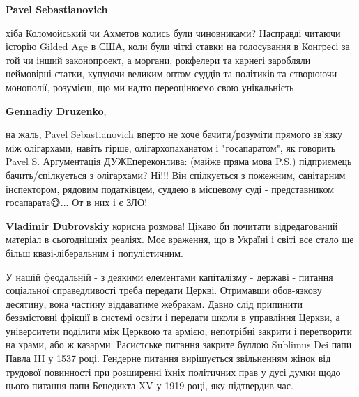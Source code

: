 \begin{itemize}
\begin{itemize}
\textbf{Pavel Sebastianovich} 

хіба Коломойський чи Ахметов колись були чиновниками? Насправді читаючи історію
Gilded Age в США, коли були чіткі ставки на голосування в Конгресі за той чи
інший законопроект, а моргани, рокфелери та карнегі заробляли неймовірні
статки, купуючи великим оптом суддів та політиків та створюючи монополії,
розумієш, що ми надто переоцінюємо свою унікальність \Smiley[1.0][yellow]


 
\textbf{Gennadiy Druzenko}, 

на жаль, Pavel Sebastianovich вперто не хоче бачити/розуміти прямого зв'язку
між олігархами, навіть гірше, олігархопаханатом і "госапаратом", як говорить
Pavel S. Аргументація ДУЖЕ\Laughey[1.0][white] переконлива: (майже пряма мова P.S.) підприємець
бачить/спілкується з олігархами? Ні!!! Він спілкується з пожежним, санітарним
інспектором, рядовим податківцем, суддею в місцевому суді - представником
госапарата😅... От в них і є ЗЛО!

 
\textbf{Vladimir Dubrovskiy} корисна розмова! Цікаво би почитати відредагований
матеріал в сьогоднішніх реаліях. Моє враження, що в Україні і світі все стало
ще більш квазі-ліберальним і популістичним.



\end{itemize}

 

У нашій феодальній - з деякими елементами капіталізму - державі - питання
соціальної справедливості треба передати Церкві. Отримавши обов-язкову
десятину, вона частину віддаватиме жебракам. Давно слід припинити беззмістовні
фрікції в системі освіти і передати школи в управління Церкви, а університети
поділити між Церквою та армією, непотрібні закрити і перетворити на храми, або
ж казарми. Расистське питання закрите буллою Sublimus Dei папи Павла III у 1537
році. Гендерне питання вирішується звільненням жінок від трудової повинності
при розширенні їхніх політичних прав у дусі думки щодо цього питання папи
Бенедикта XV у 1919 році, яку підтвердив час.



\end{itemize}
